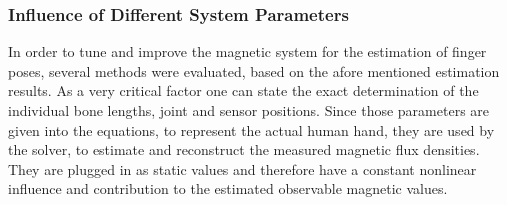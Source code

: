 
	
\subsubsection{Influence of Different System Parameters}

In order to tune and improve the magnetic system for the estimation of finger poses, several methods were evaluated, based on the afore mentioned estimation results. As a very critical factor one can state the exact determination of the individual bone lengths, joint and sensor positions. Since those parameters are given into the equations, to represent the actual human hand, they are used by the solver, to estimate and reconstruct the measured magnetic flux densities. They are plugged in as static values and therefore have a constant nonlinear influence and contribution to the estimated observable magnetic values. 

